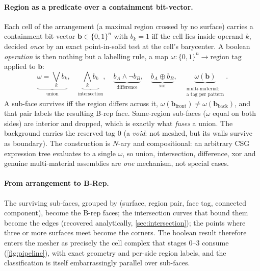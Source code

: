 \documentclass[11pt,a4paper]{article}
\numberwithin{equation}{section}
\newcommand{\vv}[1]{\mathbf{#1}}
\begin{document}
\paragraph{Region as a predicate over a containment bit-vector.}
Each cell of the arrangement (a maximal region crossed by no surface) carries a
containment bit-vector $\vv{b}\in\{0,1\}^n$ with $b_k=1$ iff the cell lies inside
operand $k$, decided \emph{once} by an exact point-in-solid test at the cell's
barycenter. A boolean \emph{operation} is then nothing but a labelling rule, a
map $\omega:\{0,1\}^n\to\text{region tag}$ applied to $\vv{b}$:
\begin{equation}
\label{eq:regionpred}
\underbrace{\omega=\textstyle\bigvee_k b_k}_{\text{union}},\quad
\underbrace{\textstyle\bigwedge_k b_k}_{\text{intersection}},\quad
\underbrace{b_A\wedge\neg b_B}_{\text{difference}},\quad
\underbrace{b_A\oplus b_B}_{\text{xor}},\quad
\underbrace{\omega(\vv{b})}_{\substack{\text{multi-material:}\\\text{a tag per pattern}}} .
\end{equation}
A sub-face survives iff the region differs across it,
$\omega(\vv{b}_{\text{front}})\neq\omega(\vv{b}_{\text{back}})$, and that pair
labels the resulting B-rep face. Same-region sub-faces ($\omega$ equal on both
sides) are interior and dropped, which is exactly what \emph{fuses} a union.
The background carries the reserved tag $0$ (a \emph{void}: not meshed, but its
walls survive as boundary). The construction is $N$-ary and compositional: an
arbitrary CSG expression tree evaluates to a single $\omega$, so union,
intersection, difference, xor and genuine multi-material assemblies are
\emph{one} mechanism, not special cases.

\paragraph{From arrangement to B-Rep.}
The surviving sub-faces, grouped by (surface, region pair, face tag, connected
component), become the B-rep faces; the intersection curves that bound them
become the edges (recovered analytically, \cref{sec:intersection}); the points
where three or more surfaces meet become the corners. The boolean result
therefore enters the mesher as precisely the cell complex that stages $0$--$3$
consume (\cref{fig:pipeline}), with exact geometry and per-side region labels,
and the classification is itself embarrassingly parallel over sub-faces.
\end{document}
